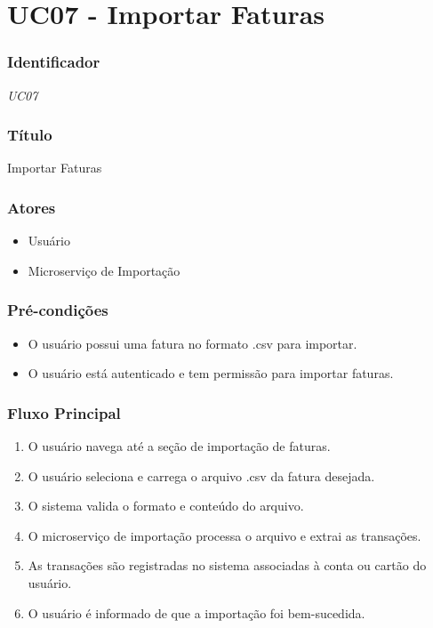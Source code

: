 \chapter{UC07 - Importar Faturas}
\label{apendiceUC07}

\subsection*{Identificador}
\textit{UC07}

\subsection*{Título}
Importar Faturas

\subsection*{Atores}
\begin{addmargin}[1.5cm]{0cm}
	\begin{itemize}
		\item Usuário
		\item Microserviço de Importação
	\end{itemize}
\end{addmargin}

\subsection*{Pré-condições}
\begin{addmargin}[1.5cm]{0cm}
	\begin{itemize}
		\item O usuário possui uma fatura no formato .csv para importar.
		\item O usuário está autenticado e tem permissão para importar faturas.
	\end{itemize}
\end{addmargin}

\subsection*{Fluxo Principal}
\begin{addmargin}[1.5cm]{0cm}
	\begin{enumerate}
		\item O usuário navega até a seção de importação de faturas.
		\item O usuário seleciona e carrega o arquivo .csv da fatura desejada.
		\item O sistema valida o formato e conteúdo do arquivo.
		\item O microserviço de importação processa o arquivo e extrai as transações.
		\item As transações são registradas no sistema associadas à conta ou cartão do usuário.
		\item O usuário é informado de que a importação foi bem-sucedida.
	\end{enumerate}
\end{addmargin}

